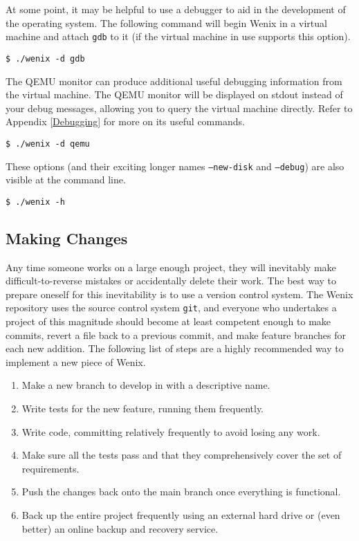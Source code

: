 At some point, it may be helpful to use a debugger to aid in the development of the operating system. The following command will begin Wenix in a virtual machine and attach \texttt{gdb} to it (if the virtual machine in use supports this option).
\begin{verbatim}
$ ./wenix -d gdb\end{verbatim}

The QEMU monitor can produce additional useful debugging information from the virtual machine. The QEMU monitor will be displayed on stdout instead of your debug messages, allowing you to query the virtual machine directly. Refer to Appendix \ref{Debugging} for more on its useful commands.
\begin{verbatim}
$ ./wenix -d qemu\end{verbatim}

These options (and their exciting longer names \texttt{--new-disk} and \texttt{--debug}) are also visible at the command line.
\begin{verbatim}
$ ./wenix -h\end{verbatim}



\subsection{Making Changes}
Any time someone works on a large enough project, they will inevitably make difficult-to-reverse mistakes or accidentally delete their work. The best way to prepare oneself for this inevitability is to use a version control system. The Wenix repository uses the source control system \texttt{git}, and everyone who undertakes a project of this magnitude should become at least competent enough to make commits, revert a file back to a previous commit, and make feature branches for each new addition. The following list of steps are a highly recommended way to implement a new piece of Wenix.
\begin{enumerate}
    \item Make a new branch to develop in with a descriptive name.
    \item Write tests for the new feature, running them frequently.
    \item Write code, committing relatively frequently to avoid losing any work.
    \item Make sure all the tests pass and that they comprehensively cover the set of requirements.
    \item Push the changes back onto the main branch once everything is functional.
    \item Back up the entire project frequently using an external hard drive or (even better) an online backup and recovery service.
\end{enumerate}

